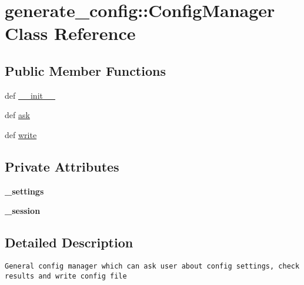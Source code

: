 \hypertarget{classgenerate__config_1_1ConfigManager}{
\section{generate\_\-config::ConfigManager Class Reference}
\label{classgenerate__config_1_1ConfigManager}
}
\subsection*{Public Member Functions}
\begin{CompactItemize}
\item 
def \hyperlink{classgenerate__config_1_1ConfigManager_9d306a6d2e086a1dd9175423ad415798}{\_\-\_\-init\_\-\_\-}
\item 
def \hyperlink{classgenerate__config_1_1ConfigManager_277e7238684d6750957bf2981e0eec14}{ask}
\item 
def \hyperlink{classgenerate__config_1_1ConfigManager_50916dd9f4420c45c85048c3448dfd9e}{write}
\end{CompactItemize}
\subsection*{Private Attributes}
\begin{CompactItemize}
\item 
\hypertarget{classgenerate__config_1_1ConfigManager_c7cc7bdff5ea3be7296ab6400ad0f61f}{
\textbf{\_\-settings}}
\label{classgenerate__config_1_1ConfigManager_c7cc7bdff5ea3be7296ab6400ad0f61f}

\item 
\hypertarget{classgenerate__config_1_1ConfigManager_4df37a3c3f5e0d781cf0344774e1eff0}{
\textbf{\_\-session}}
\label{classgenerate__config_1_1ConfigManager_4df37a3c3f5e0d781cf0344774e1eff0}

\end{CompactItemize}


\subsection{Detailed Description}


\footnotesize\begin{verbatim}
General config manager which can ask user about config settings, check results and write config file
\end{verbatim}
\normalsize
 

